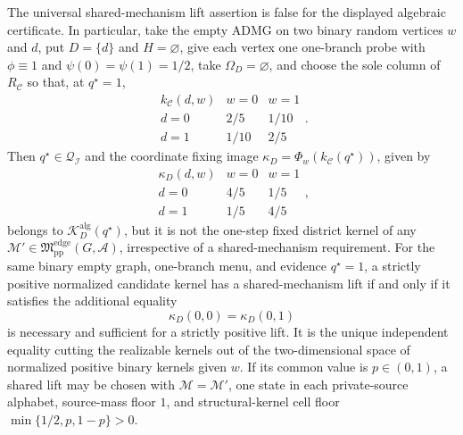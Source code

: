 The universal shared-mechanism lift assertion is false for the displayed algebraic certificate.  In particular, take the empty ADMG on two binary random vertices \(w\) and \(d\), put \(D=\{d\}\) and \(H=\varnothing\), give each vertex one one-branch probe with \(\phi\equiv1\) and \(\psi(0)=\psi(1)=1/2\), take \(\Omega_D=\varnothing\), and choose the sole column of \(R_{\mathcal C}\) so that, at \(q^{\star}=1\),
\[
\begin{array}{c|cc}
k_{\mathcal C}(d,w)&w=0&w=1\\ \hline
d=0&2/5&1/10\\
d=1&1/10&2/5
\end{array}.
\]
Then \(q^{\star}\in\mathcal Q_{\mathcal I}\) and the coordinate fixing image \(\kappa_D=\Phi_w(k_{\mathcal C}(q^{\star}))\), given by
\[
\begin{array}{c|cc}
\kappa_D(d,w)&w=0&w=1\\ \hline
d=0&4/5&1/5\\
d=1&1/5&4/5
\end{array},
\]
belongs to \(\mathcal K_D^{\mathrm{alg}}(q^{\star})\), but it is not the one-step fixed district kernel of any \(\mathcal M'\in\mathfrak M_{\mathrm{pp}}^{\mathrm{edge}}(G,\mathcal A)\), irrespective of a shared-mechanism requirement.  For the same binary empty graph, one-branch menu, and evidence \(q^{\star}=1\), a strictly positive normalized candidate kernel has a shared-mechanism lift if and only if it satisfies the additional equality
\[
 \kappa_D(0,0)=\kappa_D(0,1)
\]
is necessary and sufficient for a strictly positive lift.  It is the unique independent equality cutting the realizable kernels out of the two-dimensional space of normalized positive binary kernels given \(w\).  If its common value is \(p\in(0,1)\), a shared lift may be chosen with \(\mathcal M=\mathcal M'\), one state in each private-source alphabet, source-mass floor \(1\), and structural-kernel cell floor \(\min\{1/2,p,1-p\}>0\).